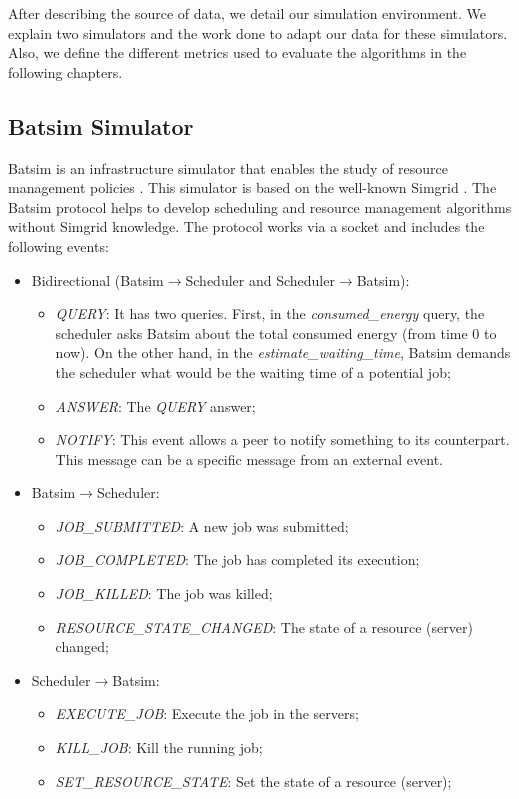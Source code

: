 After describing the source of data, we detail our simulation environment. We explain two simulators and the work done to adapt our data for these simulators. Also, we define the different metrics used to evaluate the algorithms in the following chapters.

\subsection{Batsim Simulator}
Batsim is an infrastructure simulator that enables the study of resource management policies \cite{batsim_jsspp16}. This simulator is based on the well-known Simgrid \cite{casanova2001Simgrid}. The Batsim protocol helps to develop scheduling and resource management algorithms without Simgrid knowledge. The protocol works via a socket and includes the following events:
\begin{itemize}
    \item Bidirectional (Batsim$\rightarrow$Scheduler and Scheduler$\rightarrow$Batsim):
    \begin{itemize}
        \item \textit{QUERY}: It has two queries. First, in the \textit{consumed\_energy} query, the scheduler asks Batsim about the total consumed energy (from time 0 to now). On the other hand, in the \textit{estimate\_waiting\_time}, Batsim demands the scheduler what would be the waiting time of a potential job;
        \item \textit{ANSWER}: The \textit{QUERY} answer;
        \item \textit{NOTIFY}: This event allows a peer to notify something to its counterpart. This message can be a specific message from an external event.
    \end{itemize}
    \item Batsim$\rightarrow$Scheduler:
    \begin{itemize}
        \item \textit{JOB\_SUBMITTED}: A new job was submitted;
        \item \textit{JOB\_COMPLETED}: The job has completed its execution;
        \item \textit{JOB\_KILLED}: The job was killed;
        \item \textit{RESOURCE\_STATE\_CHANGED}: The state of a resource (server) changed;
    \end{itemize}
    \item Scheduler$\rightarrow$Batsim:
    \begin{itemize}
        \item \textit{EXECUTE\_JOB}: Execute the job in the servers;
        \item \textit{KILL\_JOB}: Kill the running job;
        \item \textit{SET\_RESOURCE\_STATE}: Set the state of a resource (server);
    \end{itemize}
\end{itemize}

